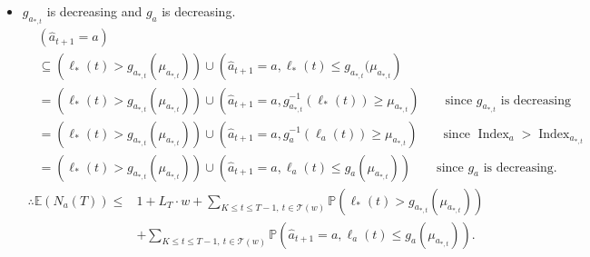 \documentclass[letterpaper]{article} %
\newcommand{\ArmAt}{\hat{a}}
\newcommand{\IsEqual}{=}
\newcommand{\optArm}[1]{a_{*, #1}}
\newcommand{\noChange}{\mathcal{T}}
\newcommand{\numChanges}{L}
\newcommand{\windowsize}{w}
\begin{document}
\begin{itemize}
\item $g_{\optArm{t}}$ is decreasing and $g_a$ is decreasing.
\begin{align*}
&(\ArmAt_{t+1} \IsEqual a) \\
&\subseteq \left(\ell_*(t) > g_{\optArm{t}}(\mu_{\optArm{t}})\right) \cup \left(\ArmAt_{t+1} \IsEqual a, \ell_*(t) \leq g_{\optArm{t}}(\mu_{\optArm{t}}\right) \\
&= \left(\ell_*(t) > g_{\optArm{t}}(\mu_{\optArm{t}})\right) \cup \left(\ArmAt_{t+1} \IsEqual a, g_{\optArm{t}}^{-1}(\ell_*(t)) \geq \mu_{\optArm{t}}\right) \qquad \text{since $g_{\optArm{t}}$ is decreasing} \\
&= \left(\ell_*(t) > g_{\optArm{t}}(\mu_{\optArm{t}})\right) \cup \left(\ArmAt_{t+1} \IsEqual a, g_a^{-1}(\ell_a(t)) \geq \mu_{\optArm{t}}\right) \qquad \text{since $\operatorname{Index}_a>\operatorname{Index}_{\optArm{t}}$} \\
&= \left(\ell_*(t) > g_{\optArm{t}}(\mu_{\optArm{t}})\right) \cup \left(\ArmAt_{t+1} \IsEqual a, \ell_a(t) \leq g_a(\mu_{\optArm{t}})\right) \qquad \text{since $g_a$ is decreasing.}
\end{align*}
\begin{align}
\label{exp_of_N_eq4}
\therefore \mathds{E}(N_a(T)) \leq &1 + \numChanges_T \cdot \windowsize +  \sum_{K \leq t \leq T-1, \ t \in \noChange(\windowsize)} \mathds{P}\left(\ell_*(t) > g_{\optArm{t}}(\mu_{\optArm{t}})\right) \nonumber \\
%
&+ \sum_{K \leq t \leq T-1, \ t \in \noChange(\windowsize)} \mathds{P}\left(\ArmAt_{t+1} \IsEqual a, \ell_a(t) \leq g_a(\mu_{\optArm{t}})\right).
\end{align}
\end{itemize}
\end{document}
